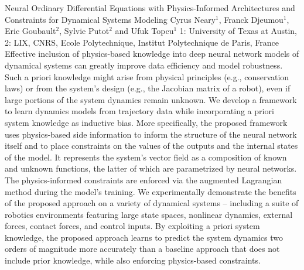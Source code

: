 \begin{addmargin}[2em]{0em}
\vspace{1.5ex}
\abs
{Neural Ordinary Differential Equations with Physics-Informed Architectures and Constraints for Dynamical Systems Modeling}
{Cyrus Neary$^1$, Franck Djeumou$^1$, Eric Goubault$^2$, Sylvie Putot$^2$ and Ufuk Topcu$^1$}
{1: University of Texas at Austin, 2: LIX, CNRS, Ecole Polytechnique, Institut Polytechnique de Paris, France}
{Effective inclusion of physics-based knowledge into deep neural network models of dynamical systems can greatly improve data efficiency and model robustness. Such a priori knowledge might arise from physical principles (e.g., conservation laws) or from the system's design (e.g., the Jacobian matrix of a robot), even if large portions of the system dynamics remain unknown. We develop a framework to learn dynamics models from trajectory data while incorporating a priori system knowledge as inductive bias. More specifically, the proposed framework uses physics-based side information to inform the structure of the neural network itself and to place constraints on the values of the outputs and the internal states of the model. It represents the system's vector field as a composition of known and unknown functions, the latter of which are parametrized by neural networks. The physics-informed constraints are enforced via the augmented Lagrangian method during the model's training. We experimentally demonstrate the benefits of the proposed approach on a variety of dynamical systems -- including a suite of robotics environments featuring large state spaces, nonlinear dynamics, external forces, contact forces, and control inputs. By exploiting a priori system knowledge, the proposed approach learns to predict the system dynamics two orders of magnitude more accurately than a baseline approach that does not include prior knowledge, while also enforcing physics-based constraints.}



\end{addmargin}
